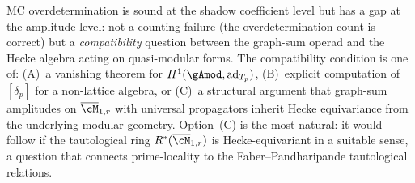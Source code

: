 \begin{remark}
MC overdetermination is sound at the shadow coefficient level but
has a gap at the amplitude level: not a counting failure
\textup{(}the overdetermination count is correct\textup{)} but a
\emph{compatibility} question between the graph-sum operad and
the Hecke algebra acting on quasi-modular forms. The compatibility
condition is one of: \textup{(A)}~a vanishing theorem for
$H^1(\gAmod, \mathrm{ad}_{T_p})$,
\textup{(B)}~explicit computation of $[\delta_p]$ for a
non-lattice algebra, or
\textup{(C)}~a structural argument that graph-sum amplitudes
on $\overline{\cM}_{1,r}$ with universal propagators inherit
Hecke equivariance from the underlying modular geometry.
Option~(C) is the most natural: it would follow if the
tautological ring $R^*(\overline{\cM}_{1,r})$ is
Hecke-equivariant in a suitable sense, a question that connects
prime-locality to the Faber--Pandharipande tautological relations.
\end{remark}

